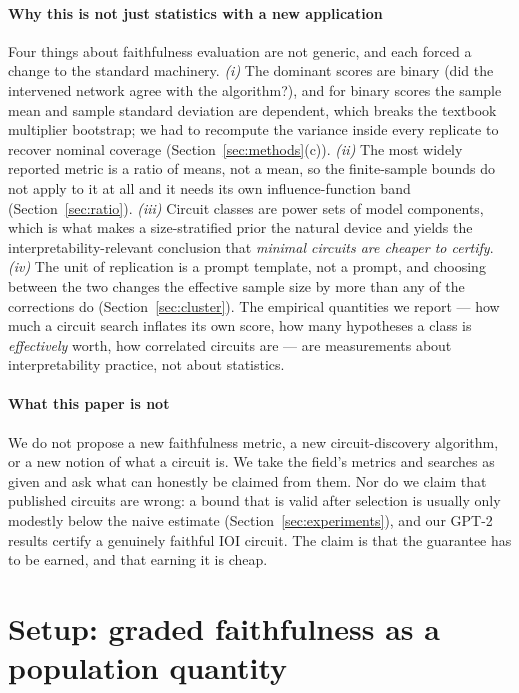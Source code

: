 \paragraph{Why this is not just statistics with a new application}
Four things about faithfulness evaluation are not generic, and each forced a
change to the standard machinery. \emph{(i)} The dominant scores are binary
(did the intervened network agree with the algorithm?), and for binary scores the
sample mean and sample standard deviation are dependent, which breaks the
textbook multiplier bootstrap; we had to recompute the variance inside every
replicate to recover nominal coverage (Section~\ref{sec:methods}(c)).
\emph{(ii)} The most widely reported metric is a ratio of means, not a mean, so
the finite-sample bounds do not apply to it at all and it needs its own
influence-function band (Section~\ref{sec:ratio}). \emph{(iii)} Circuit classes
are power sets of model components, which is what makes a size-stratified prior
the natural device and yields the interpretability-relevant conclusion that
\emph{minimal circuits are cheaper to certify}. \emph{(iv)} The unit of
replication is a prompt template, not a prompt, and choosing between the two
changes the effective sample size by more than any of the corrections do
(Section~\ref{sec:cluster}). The empirical quantities we report --- how much a
circuit search inflates its own score, how many hypotheses a class is
\emph{effectively} worth, how correlated circuits are --- are measurements about
interpretability practice, not about statistics.

\paragraph{What this paper is not}
We do not propose a new faithfulness metric, a new circuit-discovery algorithm,
or a new notion of what a circuit is. We take the field's metrics and searches as
given and ask what can honestly be claimed from them. Nor do we claim that
published circuits are wrong: a bound that is valid after selection is usually
only modestly below the naive estimate (Section~\ref{sec:experiments}), and our
GPT-2 results certify a genuinely faithful IOI circuit. The claim is that the
guarantee has to be earned, and that earning it is cheap.

\section{Setup: graded faithfulness as a population quantity}
\label{sec:setup}

